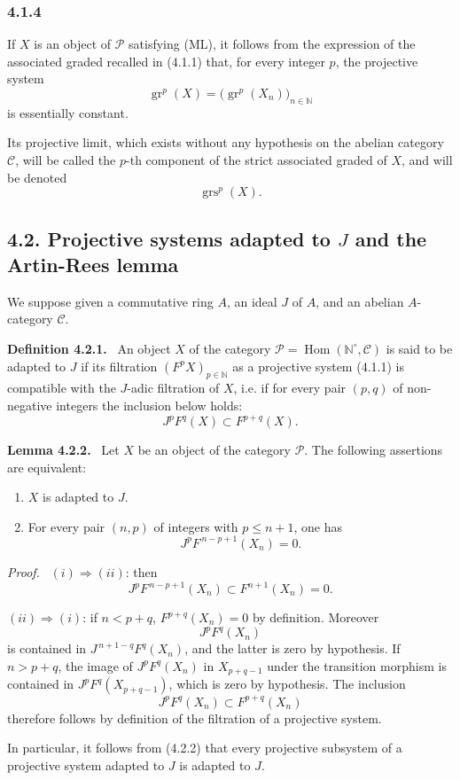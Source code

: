 \documentclass[11pt]{article}
\newenvironment{statement}[1]{\par\medskip\noindent\textbf{#1.}\ }{\par\medskip}
\newenvironment{prooftext}[1][Proof]{\par\noindent\emph{#1.}\ }{\par\medskip}
\DeclareMathOperator{\Hom}{Hom}
\providecommand{\gr}{\operatorname{gr}}
\providecommand{\Hom}{\operatorname{Hom}}
\providecommand{\gr}{\operatorname{gr}}
\providecommand{\gr}{\operatorname{gr}}
\providecommand{\grs}{\operatorname{grs}}
\providecommand{\Hom}{\operatorname{Hom}}
\begin{document}
\subsubsection*{4.1.4}
If \(X\) is an object of \(\mathcal P\) satisfying (ML), it follows from the expression of the associated graded recalled in (4.1.1) that, for every integer \(p\), the projective system
\[
\gr^p(X)=\bigl(\gr^p(X_n)\bigr)_{n\in\mathbb N}
\]
is essentially constant.

Its projective limit, which exists without any hypothesis on the abelian category \(\mathcal C\), will be called the \(p\)-th component of the strict associated graded of \(X\), and will be denoted
\[
\grs^p(X).
\]

\subsection*{4.2. Projective systems adapted to \(J\) and the Artin-Rees lemma}

We suppose given a commutative ring \(A\), an ideal \(J\) of \(A\), and an abelian \(A\)-category \(\mathcal C\).

\begin{statement}{Definition 4.2.1}
An object \(X\) of the category \(\mathcal P=\Hom(\mathbb N^\circ,\mathcal C)\) is said to be adapted to \(J\) if its filtration \((F^pX)_{p\in\mathbb N}\) as a projective system (4.1.1) is compatible with the \(J\)-adic filtration of \(X\), i.e. if for every pair \((p,q)\) of non-negative integers the inclusion below holds:
\[
J^pF^q(X)\subset F^{p+q}(X).
\]
\end{statement}

\begin{statement}{Lemma 4.2.2}
Let \(X\) be an object of the category \(\mathcal P\). The following assertions are equivalent:
\begin{enumerate}[label=\textup{(\roman*)}]
\item \(X\) is adapted to \(J\).
\item For every pair \((n,p)\) of integers with \(p\le n+1\), one has
\[
J^pF^{\,n-p+1}(X_n)=0 .
\]
\end{enumerate}
\end{statement}

\begin{prooftext}
\((i)\Rightarrow(ii)\): then
\[
J^pF^{\,n-p+1}(X_n)\subset F^{n+1}(X_n)=0.
\]

\((ii)\Rightarrow(i)\): if \(n<p+q\), \(F^{p+q}(X_n)=0\) by definition. Moreover
\[
J^pF^q(X_n)
\]
is contained in \(J^{\,n+1-q}F^q(X_n)\), and the latter is zero by hypothesis. If \(n>p+q\), the image of \(J^pF^q(X_n)\) in \(X_{p+q-1}\) under the transition morphism is contained in \(J^pF^q(X_{p+q-1})\), which is zero by hypothesis. The inclusion
\[
J^pF^q(X_n)\subset F^{p+q}(X_n)
\]
therefore follows by definition of the filtration of a projective system.

In particular, it follows from (4.2.2) that every projective subsystem of a projective system adapted to \(J\) is adapted to \(J\).
\end{prooftext}
\end{document}

